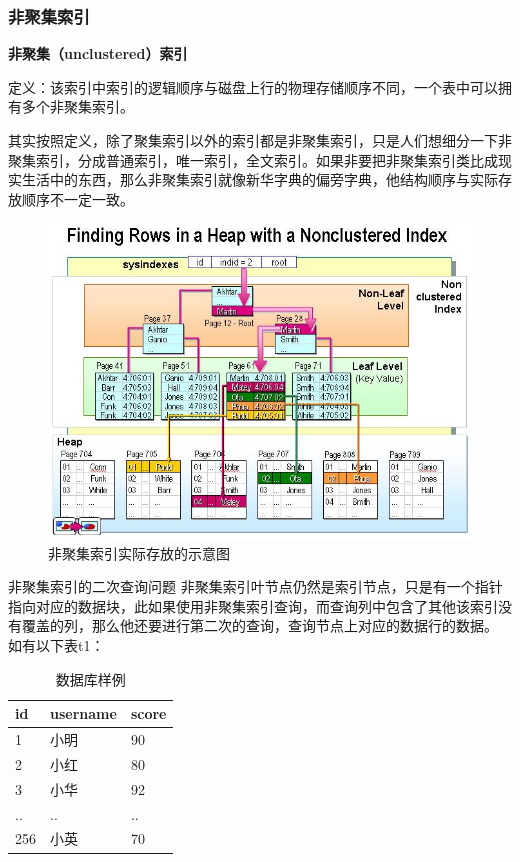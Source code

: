 \documentclass[UTF8]{ctexart}
\begin{document}
\subsubsection{非聚集索引}

\textbf{非聚集（unclustered）索引}

定义：该索引中索引的逻辑顺序与磁盘上行的物理存储顺序不同，一个表中可以拥有多个非聚集索引。

其实按照定义，除了聚集索引以外的索引都是非聚集索引，只是人们想细分一下非聚集索引，分成普通索引，唯一索引，全文索引。如果非要把非聚集索引类比成现实生活中的东西，那么非聚集索引就像新华字典的偏旁字典，他结构顺序与实际存放顺序不一定一致。

\begin{figure}[htbp]
\centering
\includegraphics[height=1\linewidth,width=1\textwidth]{Figure/index1.png}
\caption{非聚集索引实际存放的示意图}
\end{figure}
非聚集索引的二次查询问题
非聚集索引叶节点仍然是索引节点，只是有一个指针指向对应的数据块，此如果使用非聚集索引查询，而查询列中包含了其他该索引没有覆盖的列，那么他还要进行第二次的查询，查询节点上对应的数据行的数据。
如有以下表t1：
\begin{table}[]
    \caption{数据库样例}
    \vspace{20pt}
    \centering
    \begin{tabular}{p{3cm}p{2.5cm}p{2.5cm}}
        \hline
        id  & username & score\\
        \hline
        1	&小明	&90\\
		2	&小红&	80\\
		3	&小华&	92\\
		..	&..	&..\\
		256	&小英&	70\\
        \hline       
    \end{tabular}
    \label{bs2}
\end{table}
\end{document}
